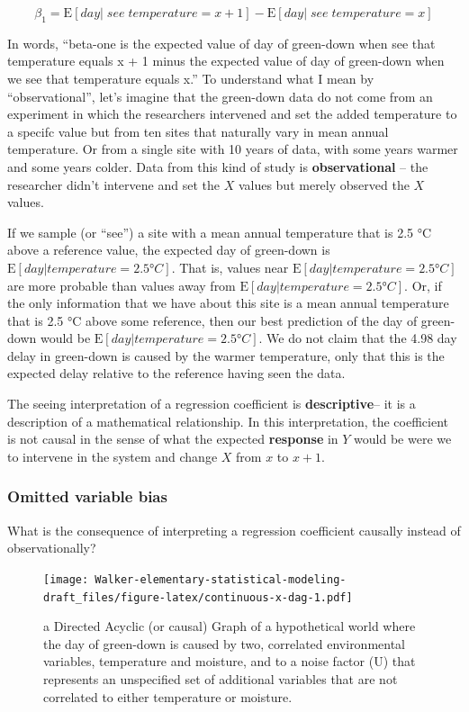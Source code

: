 \documentclass[]{book}
\begin{document}
\begin{equation}
\beta_1 = \textrm{E}[day|\;see\;temperature = x+1] - \textrm{E}[day|\;see \;temperature = x]
\end{equation}

In words, ``beta-one is the expected value of day of green-down when see that temperature equals x + 1 minus the expected value of day of green-down when we see that temperature equals x.'' To understand what I mean by ``observational'', let's imagine that the green-down data do not come from an experiment in which the researchers intervened and set the added temperature to a specifc value but from ten sites that naturally vary in mean annual temperature. Or from a single site with 10 years of data, with some years warmer and some years colder. Data from this kind of study is \textbf{observational} -- the researcher didn't intervene and set the \(X\) values but merely observed the \(X\) values.

If we sample (or ``see'') a site with a mean annual temperature that is 2.5 °C above a reference value, the expected day of green-down is \(\textrm{E}[day|temperature = 2.5 °C]\). That is, values near \(\textrm{E}[day|temperature = 2.5 °C]\) are more probable than values away from \(\textrm{E}[day|temperature = 2.5 °C]\). Or, if the only information that we have about this site is a mean annual temperature that is 2.5 °C above some reference, then our best prediction of the day of green-down would be \(\textrm{E}[day|temperature = 2.5 °C]\). We do not claim that the 4.98 day delay in green-down is caused by the warmer temperature, only that this is the expected delay relative to the reference having seen the data.

The seeing interpretation of a regression coefficient is \textbf{descriptive}-- it is a description of a mathematical relationship. In this interpretation, the coefficient is not causal in the sense of what the expected \textbf{response} in \(Y\) would be were we to intervene in the system and change \(X\) from \(x\) to \(x+1\).

\hypertarget{omitted-variable-bias}{%
\subsubsection{Omitted variable bias}\label{omitted-variable-bias}}

What is the consequence of interpreting a regression coefficient causally instead of observationally?

\begin{figure}
\centering
\texttt{[image: Walker-elementary-statistical-modeling-draft\_files/figure-latex/continuous-x-dag-1.pdf]}
\caption{\label{fig:continuous-x-dag}a Directed Acyclic (or causal) Graph of a hypothetical world where the day of green-down is caused by two, correlated environmental variables, temperature and moisture, and to a noise factor (U) that represents an unspecified set of additional variables that are not correlated to either temperature or moisture.}
\end{figure}
\end{document}
